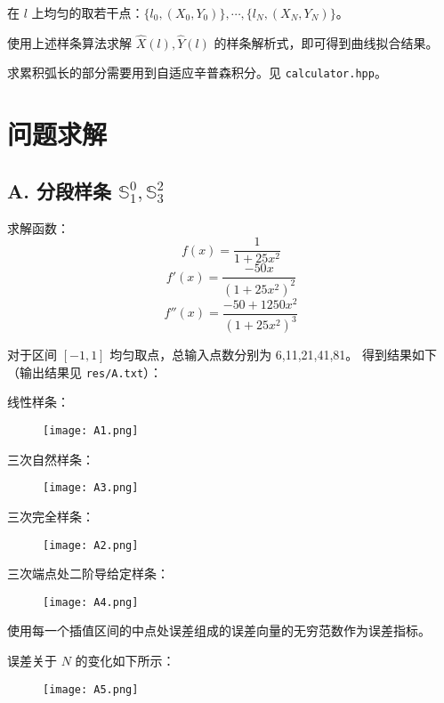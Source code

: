 \documentclass[lang=cn,a4paper,newtx,bibend=bibtex]{elegantpaper}
\newcommand{\SBB}{\mathbb{S}}
\begin{document}
在 $l$ 上均匀的取若干点：$\{l_0, (X_0, Y_0)\}, \cdots, \{l_N, (X_N, Y_N)\}$。

使用上述样条算法求解 $\hat{X}(l), \hat{Y}(l)$ 的样条解析式，即可得到曲线拟合结果。

求累积弧长的部分需要用到自适应辛普森积分。见 \lstinline{calculator.hpp}。

\section{问题求解}

\subsection{A. 分段样条 $\SBB_1^0, \SBB_3^2$}

求解函数：
\[f(x) = \dfrac{1}{1 + 25x^2}\]
\[f'(x) = \dfrac{-50x}{(1+25x^2)^2}\]
\[f''(x) = \dfrac{-50+1250x^2}{(1+25x^2)^3}\]

对于区间 $[-1, 1]$ 均匀取点，总输入点数分别为 6,11,21,41,81。
得到结果如下（输出结果见 \lstinline{res/A.txt}）：

线性样条：

\begin{figure}[H]
  \centering
  \texttt{[image: A1.png]}
\end{figure}

三次自然样条：

\begin{figure}[H]
  \centering
  \texttt{[image: A3.png]}
\end{figure}

三次完全样条：

\begin{figure}[H]
  \centering
  \texttt{[image: A2.png]}
\end{figure}

三次端点处二阶导给定样条：

\begin{figure}[H]
  \centering
  \texttt{[image: A4.png]}
\end{figure}

使用每一个插值区间的中点处误差组成的误差向量的无穷范数作为误差指标。

误差关于 $N$ 的变化如下所示：

\begin{figure}[H]
  \centering
  \texttt{[image: A5.png]}
\end{figure}
\end{document}
